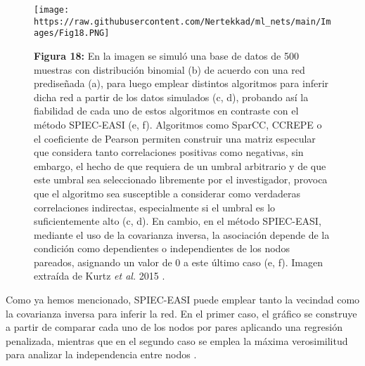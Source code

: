 \documentclass[
]{book}
\begin{document}
\begin{figure}
\centering
\texttt{[image: https://raw.githubusercontent.com/Nertekkad/ml\_nets/main/Images/Fig18.PNG]}
\caption{\textbf{Figura 18:} En la imagen se simuló una base de datos de 500 muestras con distribución binomial (b) de acuerdo con una red prediseñada (a), para luego emplear distintos algoritmos para inferir dicha red a partir de los datos simulados (c, d), probando así la fiabilidad de cada uno de estos algoritmos en contraste con el método SPIEC-EASI (e, f). Algoritmos como SparCC, CCREPE o el coeficiente de Pearson permiten construir una matriz especular que considera tanto correlaciones positivas como negativas, sin embargo, el hecho de que requiera de un umbral arbitrario y de que este umbral sea seleccionado libremente por el investigador, provoca que el algoritmo sea susceptible a considerar como verdaderas correlaciones indirectas, especialmente si el umbral es lo suficientemente alto (c, d). En cambio, en el método SPIEC-EASI, mediante el uso de la covarianza inversa, la asociación depende de la condición como dependientes o independientes de los nodos pareados, asignando un valor de 0 a este último caso (e, f). Imagen extraída de Kurtz \emph{et al.} 2015 \citep{kurtz2015sparse}.}
\end{figure}

Como ya hemos mencionado, SPIEC-EASI puede emplear tanto la vecindad como la covarianza inversa para inferir la red. En el primer caso, el gráfico se construye a partir de comparar cada uno de los nodos por pares aplicando una regresión penalizada, mientras que en el segundo caso se emplea la máxima verosimilitud para analizar la independencia entre nodos \citep{bonneau2006inferelator}.
\end{document}
